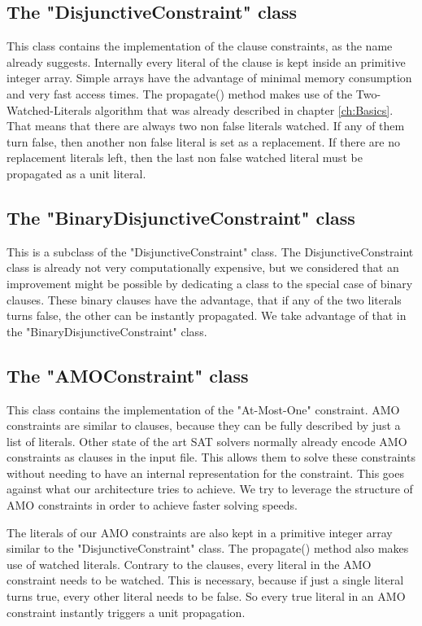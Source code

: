 \subsection{The "DisjunctiveConstraint" class}

This class contains the implementation of the clause constraints, as the name already suggests. Internally every literal of the clause is kept inside an primitive integer array. Simple arrays have the advantage of minimal memory consumption and very fast access times. The propagate() method makes use of the Two-Watched-Literals algorithm that was already described in chapter \ref{ch:Basics}. That means that there are always two non false literals watched. If any of them turn false, then another non false literal is set as a replacement. If there are no replacement literals left, then the last non false watched literal must be propagated as a unit literal.

\subsection{The "BinaryDisjunctiveConstraint" class}

This is a subclass of the "DisjunctiveConstraint" class. The DisjunctiveConstraint class is already not very computationally expensive, but we considered that an improvement might be possible by dedicating a class to the special case of binary clauses. These binary clauses have the advantage, that if any of the two literals turns false, the other can be instantly propagated. We take advantage of that in the "BinaryDisjunctiveConstraint" class.

\subsection{The "AMOConstraint" class}

This class contains the implementation of the "At-Most-One" constraint. AMO constraints are similar to clauses, because they can be fully described by just a list of literals. Other state of the art SAT solvers normally already encode AMO constraints as clauses in the input file. This allows them to solve these constraints without needing to have an internal representation for the constraint. This goes against what our architecture tries to achieve. We try to leverage the structure of AMO constraints in order to achieve faster solving speeds.
\par
The literals of our AMO constraints are also kept in a primitive integer array similar to the "DisjunctiveConstraint" class. The propagate() method also makes use of watched literals. Contrary to the clauses, every literal in the AMO constraint needs to be watched. This is necessary, because if just a single literal turns true, every other literal needs to be false. So every true literal in an AMO constraint instantly triggers a unit propagation.

